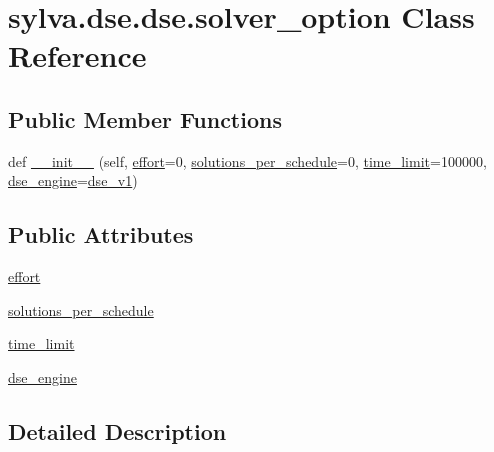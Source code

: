 \hypertarget{classsylva_1_1dse_1_1dse_1_1solver__option}{}\section{sylva.\+dse.\+dse.\+solver\+\_\+option Class Reference}
\label{classsylva_1_1dse_1_1dse_1_1solver__option}
\subsection*{Public Member Functions}
\begin{DoxyCompactItemize}
\item 
def \hyperlink{classsylva_1_1dse_1_1dse_1_1solver__option_a9dc8c1ee5f29aeabb4b6587974adfbec}{\+\_\+\+\_\+init\+\_\+\+\_\+} (self, \hyperlink{classsylva_1_1dse_1_1dse_1_1solver__option_a1cd7045a515dfd0b3d5502da487ef4e5}{effort}=0, \hyperlink{classsylva_1_1dse_1_1dse_1_1solver__option_a4bb3e9d8e2a3e8f95a39f414d0bc19f8}{solutions\+\_\+per\+\_\+schedule}=0, \hyperlink{classsylva_1_1dse_1_1dse_1_1solver__option_afaf7c917b79ce8a22c1b5e3743d95787}{time\+\_\+limit}=100000, \hyperlink{classsylva_1_1dse_1_1dse_1_1solver__option_a7a53af2287a6078049559a565fbb9e90}{dse\+\_\+engine}=\hyperlink{classsylva_1_1dse_1_1dse__engine__v1_1_1dse__v1}{dse\+\_\+v1})
\end{DoxyCompactItemize}
\subsection*{Public Attributes}
\begin{DoxyCompactItemize}
\item 
\hyperlink{classsylva_1_1dse_1_1dse_1_1solver__option_a1cd7045a515dfd0b3d5502da487ef4e5}{effort}
\item 
\hyperlink{classsylva_1_1dse_1_1dse_1_1solver__option_a4bb3e9d8e2a3e8f95a39f414d0bc19f8}{solutions\+\_\+per\+\_\+schedule}
\item 
\hyperlink{classsylva_1_1dse_1_1dse_1_1solver__option_afaf7c917b79ce8a22c1b5e3743d95787}{time\+\_\+limit}
\item 
\hyperlink{classsylva_1_1dse_1_1dse_1_1solver__option_a7a53af2287a6078049559a565fbb9e90}{dse\+\_\+engine}
\end{DoxyCompactItemize}


\subsection{Detailed Description}


